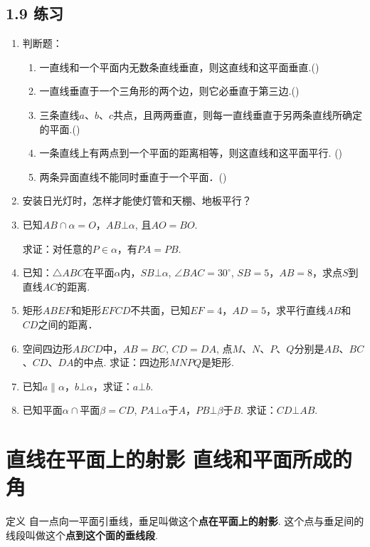 \subsection*{1.9 练习}
\begin{enumerate}
    \item 判断题：
\begin{enumerate}[(1)]
\item 一直线和一个平面内无数条直线垂直，则这直线和这平面垂直.\hfill(\quad )
\item 一直线垂直于一个三角形的两个边，则它必垂直于第三边.\hfill(\quad )
\item 三条直线$a$、$b$、$c$共点，且两两垂直，则每一直线垂直于另两条直线所确定的平面.\hfill(\quad )
\item 一条直线上有两点到一个平面的距离相等，则这直线和这平面平行. (\quad )
\item 两条异面直线不能同时垂直于一个平面．\hfill(\quad )
\end{enumerate}

\item 安装日光灯时，怎样才能使灯管和天棚、地板平行？
\item 已知$AB\cap\alpha=O$，$AB\bot\alpha$, 且$AO=BO$.

求证：对任意的$P\in\alpha$，有$PA=PB$.
\item 已知：$\triangle ABC$在平面$\alpha$内，$SB\bot\alpha$, $\angle BAC=30^{\circ}$, $SB=5$，$AB=8$，求点$S$到直线$AC$的距离.
\item 矩形$ABEF$和矩形$EFCD$不共面，已知$EF=4$，$AD=5$，求平行直线$AB$和$CD$之间的距离．
\item 空间四边形$ABCD$中，$AB=BC$, $CD=DA$, 点$M$、$N$、$P$、$Q$分别是$AB$、$BC$、$CD$、$DA$的中点. 求证：四边形$MNPQ$是矩形.
\item 已知$a\parallel \alpha$，$b\bot\alpha$，求证：$a\bot b$.
\item 已知平面$\alpha\cap$平面$\beta=CD$, $PA\bot\alpha$于$A$，$PB\bot\beta$于$B$. 求证：$CD\bot AB$.

\end{enumerate}

\section{直线在平面上的射影 直线和平面所成的角}
\begin{thm}
{定义} 自一点向一平面引垂线，垂足叫做这个\textbf{点在平面上的射影}. 这个点与垂足间的线段叫做这个\textbf{点到这个面的垂线段}.
\end{thm}


